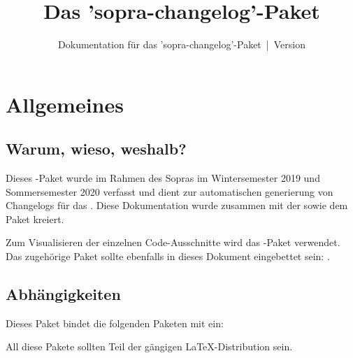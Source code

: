 \documentclass{sopra-base}
\title{Das 'sopra-changelog'-Paket}
\subtitle[Dokumentation für das 'sopra-changelog'-Paket]{Dokumentation für das 'sopra-changelog'-Paket~|~Version \thesocversion}
\begin{document}
    \maketitle%
%
%

%
%
%
%

\section{Allgemeines}
\subsection{Warum, wieso, weshalb?}
    Dieses \LaTeXe-Paket wurde im Rahmen des Sopras im
    Wintersemester 2019 und Sommersemester 2020 verfasst und dient zur automatischen generierung von Changelogs für das . Diese Dokumentation wurde zusammen mit der
     sowie dem Paket  kreiert.\par
    Zum Visualisieren der einzelnen Code-Ausschnitte wird das
    -Paket verwendet.
    Das zugehörige Paket sollte ebenfalls in dieses Dokument eingebettet sein: . 
\subsection{Abhängigkeiten}
    Dieses Paket bindet die folgenden Paketen mit ein:
    \begin{multicols}{4}
    \end{multicols}
    All diese Pakete sollten Teil der gängigen \LaTeX-Distribution sein.
\end{document}
